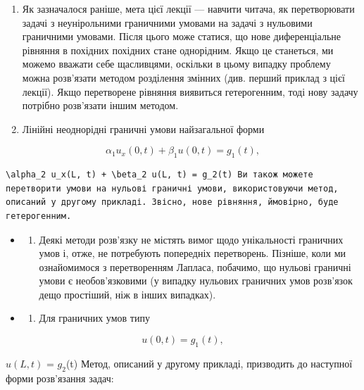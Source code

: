 \documentclass[
  ukrainian,
]{article}
\providecommand{\tightlist}{%
  \setlength{\itemsep}{0pt}\setlength{\parskip}{0pt}}
\begin{document}
\begin{enumerate}
\def\labelenumi{\arabic{enumi}.}
\item
  Як зазначалося раніше, мета цієї лекції --- навчити читача, як
  перетворювати задачі з неунірольними граничними умовами на задачі з
  нульовими граничними умовами. Після цього може статися, що нове
  диференціальне рівняння в похідних похідних стане однорідним. Якщо це
  станеться, ми можемо вважати себе щасливцями, оскільки в цьому випадку
  проблему можна розв'язати методом розділення змінних (див. перший
  приклад з цієї лекції). Якщо перетворене рівняння виявиться
  гетерогенним, тоді нову задачу потрібно розв'язати іншим методом.
\item
  Лінійні неоднорідні граничні умови найзагальної форми
\end{enumerate}

\[
\alpha_1 u_x(0, t) + \beta_1 u(0, t) = g_1(t),
\]

\begin{verbatim}
\alpha_2 u_x(L, t) + \beta_2 u(L, t) = g_2(t) Ви також можете перетворити умови на нульові граничні умови, використовуючи метод, описаний у другому прикладі. Звісно, нове рівняння, ймовірно, буде гетерогенним.
\end{verbatim}

\begin{itemize}
\tightlist
\item
  \begin{enumerate}
  \def\labelenumi{\arabic{enumi}.}
  \setcounter{enumi}{2}
  \tightlist
  \item
    Деякі методи розв'язку не містять вимог щодо унікальності граничних
    умов і, отже, не потребують попередніх перетворень. Пізніше, коли ми
    ознайомимося з перетворенням Лапласа, побачимо, що нульові граничні
    умови є необов'язковими (у випадку нульових граничних умов розв'язок
    дещо простіший, ніж в інших випадках).
  \end{enumerate}
\item
  \begin{enumerate}
  \def\labelenumi{\arabic{enumi}.}
  \setcounter{enumi}{3}
  \tightlist
  \item
    Для граничних умов типу
  \end{enumerate}
\end{itemize}

\[
u(0, t) = g_1(t),
\]

\(u(L, t)\) = \(g_2\)(t) Метод, описаний у другому прикладі, призводить
до наступної форми розв'язання задач:
\end{document}
